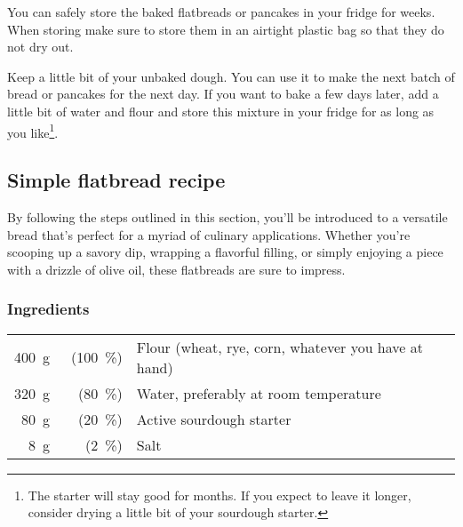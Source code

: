 You can safely store the baked flatbreads or pancakes in your fridge
for weeks. When storing make sure to store them in an airtight plastic bag so that
they do not dry out.

Keep a little bit of your unbaked dough. You can use it to make the next
batch of bread or pancakes for the next day. If you want to bake a few days later, add
a little bit of water and flour and store this mixture in your fridge
for as long as you like\footnote{The starter will stay good for months. If you expect to
leave it longer, consider drying a little bit of your sourdough starter.}.

\subsection{Simple flatbread recipe}%
\label{subsec:flat-bread-recipe}

By following the steps outlined in this section,
you'll be introduced to a versatile bread that's perfect for a myriad of
culinary applications. Whether you're scooping up a savory dip,
wrapping a flavorful filling, or simply enjoying a piece with a drizzle
of olive oil, these flatbreads are sure to impress.

\subsubsection*{Ingredients}

\begin{tabular}{r@{}rl@{}}
\qty{400}{\gram} &~(\qty{100}{\percent}) & Flour (wheat, rye, corn, whatever you have at hand)\\
\qty{320}{\gram} &  (\qty{80}{\percent}) & Water, preferably at room temperature\\
\qty{80}{\gram}  &  (\qty{20}{\percent}) & Active sourdough starter\\
\qty{8}{\gram}   &   (\qty{2}{\percent}) & Salt\\
\end{tabular}

